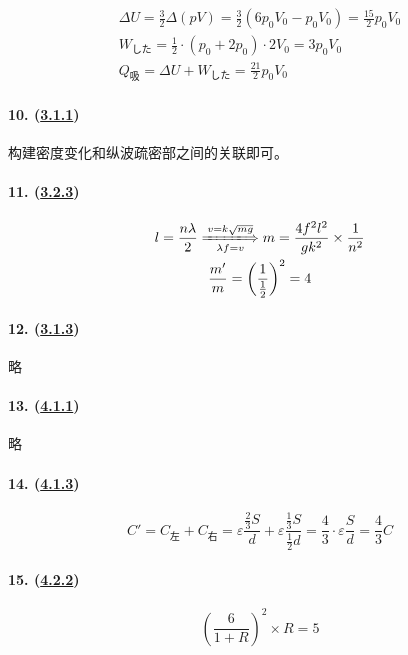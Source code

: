 \begin{gather*}
    \Delta U=\frac32\Delta(pV)=\frac32(6p_0V_0-p_0V_0)=\frac{15}{2}p_0V_0\\
    W_\textrm{した}=\frac12\cdot(p_0+2p_0)\cdot2V_0=3p_0V_0\\
    Q_\textrm{吸}=\Delta U+W_\textrm{した}=\frac{21}{2}p_0V_0
\end{gather*}

\paragraph{10. (\hyperref[subsec:1.3.1]{3.1.1})} 构建密度变化和纵波疏密部之间的关联即可。
\paragraph{11. (\hyperref[subsec:3.2.3]{3.2.3})}

\begin{gather*}
    l=\frac{n\lambda}{2}
    \xLongrightarrow[\lambda f=v]{v=k\sqrt{mg}}
    m=\frac{4f^2l^2}{gk^2}\times\frac{1}{n^2}\\
    \frac{m'}{m}=\left(\frac{1}{\frac12}\right)^2=4
\end{gather*}

\paragraph{12. (\hyperref[subsec:3.1.3]{3.1.3})} 略
\paragraph{13. (\hyperref[subsec:4.1.1]{4.1.1})} 略
\paragraph{14. (\hyperref[subsec:4.1.3]{4.1.3})}

\begin{equation*}
    C'=C_\textrm{左}+C_\textrm{右}
    =\varepsilon\frac{\frac23S}{d}+\varepsilon\frac{\frac13S}{\frac12d}
    =\frac43\cdot\varepsilon\frac Sd
    =\frac43C
\end{equation*}

\paragraph{15. (\hyperref[subsec:4.2.2]{4.2.2})}

\begin{equation*}
    \left(\frac{6}{1+R}\right)^2\times R=5
\end{equation*}


